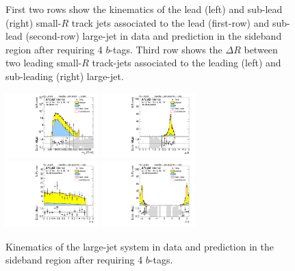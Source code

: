 \begin{figure}[htbp!]
\begin{center}
  \caption{First two rows show the kinematics of the lead (left) and sub-lead (right) small-$R$ track jets associated to the lead (first-row) and sub-lead (second-row) large-\R jet in data and prediction in the sideband region after requiring 4 $b$-tags. Third row shows the $\Delta R$ between two leading small-$R$ track-jets associated to the leading (left) and sub-leading (right) large-\R jet. }
  \label{fig:boosted-4b-sideband-ak2}
\end{center}
\end{figure}


\begin{figure}[htbp!]
\begin{center}
\includegraphics[width=0.32\textwidth,angle=-90]{figures/boosted/Sideband/b77_FourTag_Sideband_mHH_l_1.pdf}
\includegraphics[width=0.32\textwidth,angle=-90]{figures/boosted/Sideband/b77_FourTag_Sideband_hCandDr.pdf}\\
\includegraphics[width=0.32\textwidth,angle=-90]{figures/boosted/Sideband/b77_FourTag_Sideband_hCandDeta.pdf}
\includegraphics[width=0.32\textwidth,angle=-90]{figures/boosted/Sideband/b77_FourTag_Sideband_hCandDphi.pdf}
  \caption{Kinematics of the large-\R jet system in data and prediction in the sideband region after requiring 4 $b$-tags. }
  \label{fig:boosted-4b-sideband-ak10-system}
\end{center}
\end{figure}

